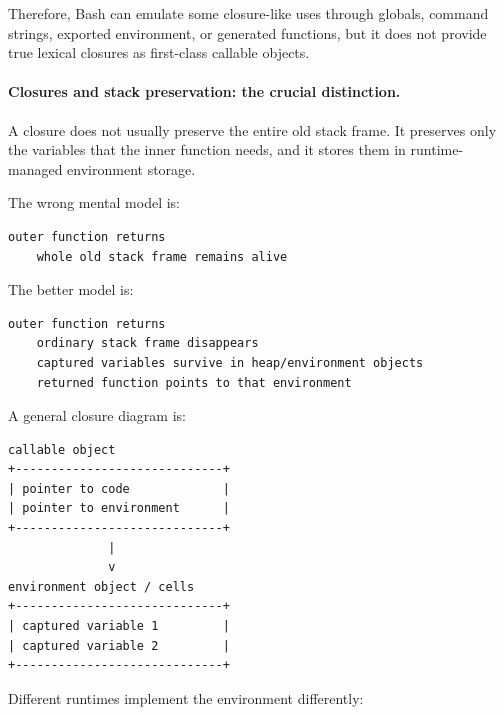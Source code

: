 Therefore, Bash can emulate some closure-like uses through globals, command strings, exported environment, or generated functions, but it does not provide true lexical closures as first-class callable objects.

\paragraph{Closures and stack preservation: the crucial distinction.}

A closure does not usually preserve the entire old stack frame. It preserves only the variables that the inner function needs, and it stores them in runtime-managed environment storage.

The wrong mental model is:

\begin{verbatim}
outer function returns
    whole old stack frame remains alive
\end{verbatim}

The better model is:

\begin{verbatim}
outer function returns
    ordinary stack frame disappears
    captured variables survive in heap/environment objects
    returned function points to that environment
\end{verbatim}

A general closure diagram is:

\begin{verbatim}
callable object
+-----------------------------+
| pointer to code             |
| pointer to environment      |
+-----------------------------+
              |
              v
environment object / cells
+-----------------------------+
| captured variable 1         |
| captured variable 2         |
+-----------------------------+
\end{verbatim}

Different runtimes implement the environment differently:

